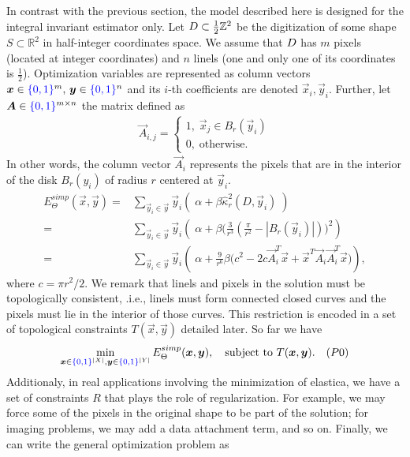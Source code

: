 In contrast with the previous section, the model described here is designed for the integral invariant estimator only. Let $D \subset \frac{1}{2}\mathbb{Z}^2$ be the digitization of some shape $S \subset \mathbb{R}^2$ %
 in half-integer coordinates space. We assume that $D$ has $m$ pixels (located at integer coordinates) and $n$ linels (one and only one of its coordinates is $\frac{1}{2}$). Optimization variables are represented as column vectors $\bm{x} \in {\color{blue}{\{0,1\}}}^{m},\, \bm{y} \in {\color{blue}{\{0,1\}}}^{n}$ and its $i$-th coefficients are denoted  $\vec{x}_i,\vec{y}_i$.  Further, let $\bm{A} \in {\color{blue}{\{0,1\}}}^{m\times n}$ the matrix defined as
\begin{align*}
	\vec{A}_{i,j} = \left\{ \begin{array}{ll}
		1,\; \vec{x}_j \in B_{r}(\vec{y}_i)\\
		0,\; \text{otherwise}.
	\end{array}\right.
\end{align*}
%
In other words, the column vector $\vec{A}_i$ represents the pixels that are in the interior of the disk $B_{r}(y_i)$ of radius $r$ centered at $\vec{y}_i$. 
\begin{align}
	E_{\Theta}^{simp}(\vec{x},\vec{y}) =& \sum_{\vec{y}_i \in \vec{y}}{ \vec{y}_i \left(\; \alpha + \beta \hat{\kappa}_{r}^2(D,\vec{y}_i) \; \right)}\\\nonumber
			   =& \sum_{\vec{y}_i \in \vec{y}}{ \vec{y}_i \left(\; \alpha  + \beta \big( \frac{3}{r^3}(\frac{\pi}{r^2} - |B_r(\vec{y}_i)|)\big)^2\right)}\\\nonumber
			   =& \sum_{\vec{y}_i \in \vec{y}}{ \vec{y}_i \left(\; \alpha + \frac{9}{r^6}\beta \big(c^2 - 2c\vec{A}_i^T\vec{x} + \vec{x}^T\vec{A}_i\vec{A}_i^T\vec{x}\big)\right)},			   
	\end{align}
%	
where $c =  \pi r^2/2$. We remark that linels and pixels in the solution must be topologically consistent, .i.e., linels must form connected closed curves and the pixels must lie in the interior of those curves. This restriction is encoded in a set of topological constraints $T(\vec{x},\vec{y})$ detailed later. So far we have
\begin{align*}
	\min_{\bm{x} \in {\color{blue}{\{0,1\}}}^{|X|}, \bm{y} \in {\color{blue}{\{0,1\}}}^{|Y|}}{E_{\Theta}^{simp}(\bm{x},\bm{y})}, \quad \text{subject to } T(\bm{x},\bm{y}). \quad (P0)
\end{align*}
%
Additionaly, in real applications involving the minimization of elastica, we have a set of constraints $R$ that plays the role of regularization. For example, we may force some of the pixels in the original shape to be part of the solution; for imaging problems, we may add a data attachment term, and so on. Finally, we can write the general optimization problem as

